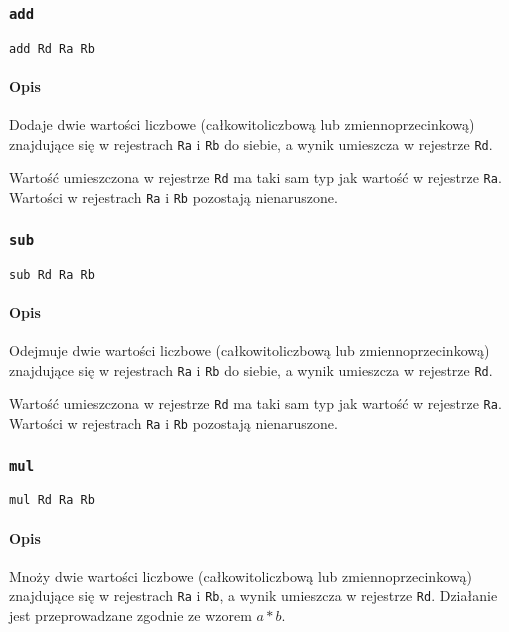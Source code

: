 \subsubsection{\texttt{add}}

\begin{lstlisting}
add Rd Ra Rb
\end{lstlisting}

\paragraph*{Opis} Dodaje dwie wartości liczbowe (całkowitoliczbową lub
zmiennoprzecinkową) znajdujące się w rejestrach \texttt{Ra} i \texttt{Rb} do
siebie, a wynik umieszcza w rejestrze \texttt{Rd}.

Wartość umieszczona w rejestrze \texttt{Rd} ma taki sam typ jak wartość w
rejestrze \texttt{Ra}. Wartości w rejestrach \texttt{Ra} i \texttt{Rb} pozostają
nienaruszone.

\subsubsection{\texttt{sub}}

\begin{lstlisting}
sub Rd Ra Rb
\end{lstlisting}

\paragraph*{Opis} Odejmuje dwie wartości liczbowe (całkowitoliczbową lub
zmiennoprzecinkową) znajdujące się w rejestrach \texttt{Ra} i \texttt{Rb} do
siebie, a wynik umieszcza w rejestrze \texttt{Rd}.

Wartość umieszczona w rejestrze \texttt{Rd} ma taki sam typ jak wartość w
rejestrze \texttt{Ra}. Wartości w rejestrach \texttt{Ra} i \texttt{Rb} pozostają
nienaruszone.

\subsubsection{\texttt{mul}}

\begin{lstlisting}
mul Rd Ra Rb
\end{lstlisting}

\paragraph*{Opis} Mnoży dwie wartości liczbowe (całkowitoliczbową lub
zmiennoprzecinkową) znajdujące się w rejestrach \texttt{Ra} i \texttt{Rb}, a
wynik umieszcza w rejestrze \texttt{Rd}. Działanie jest przeprowadzane zgodnie
ze wzorem $a * b$.


